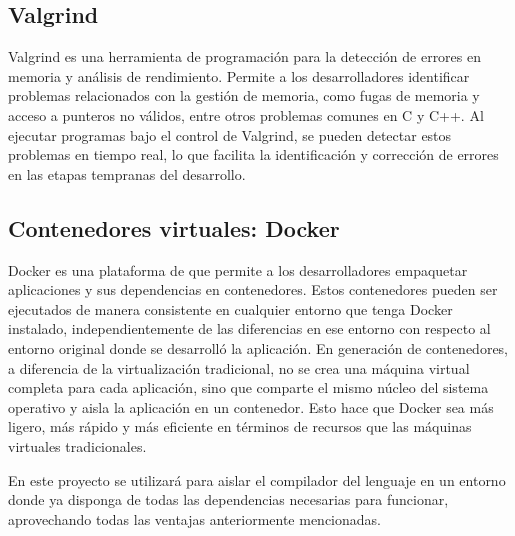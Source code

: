 \subsection{Valgrind}
Valgrind es una herramienta de programación para la detección de errores en memoria y análisis de rendimiento. Permite a los desarrolladores identificar problemas relacionados con la gestión de memoria, como fugas de memoria y acceso a punteros no válidos, entre otros problemas comunes en C y C++. Al ejecutar programas bajo el control de Valgrind, se pueden detectar estos problemas en tiempo real, lo que facilita la identificación y corrección de errores en las etapas tempranas del desarrollo.

\subsection{Contenedores virtuales: Docker}
Docker es una plataforma de que permite a los desarrolladores empaquetar aplicaciones y sus dependencias en contenedores. Estos contenedores pueden ser ejecutados de manera consistente en cualquier entorno que tenga Docker instalado, independientemente de las diferencias en ese entorno con respecto al entorno original donde se desarrolló la aplicación. En generación de contenedores, a diferencia de la virtualización tradicional, no se crea una máquina virtual completa para cada aplicación, sino que comparte el mismo núcleo del sistema operativo y aisla la aplicación en un contenedor. Esto hace que Docker sea más ligero, más rápido y más eficiente en términos de recursos que las máquinas virtuales tradicionales.


En este proyecto se utilizará para aislar el compilador del lenguaje en un entorno donde ya disponga de todas las dependencias necesarias para funcionar, aprovechando todas las ventajas anteriormente mencionadas.

